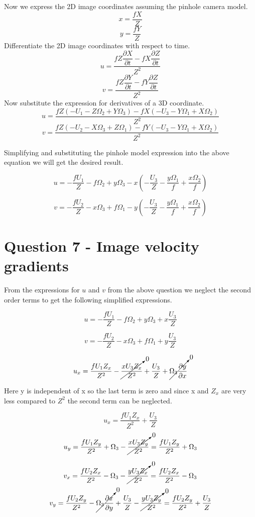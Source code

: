 \documentclass[12pt]{article}
\begin{document}
Now we express the 2D image coordinates assuming the pinhole camera model.
$$ x  = \dfrac {fX} {Z}$$
$$ y  = \dfrac {fY} {Z}$$
Differentiate the 2D image coordinates with respect to time.
$$ u  = \dfrac {fZ\dfrac {\partial X} {\partial t} - fX\dfrac {\partial Z} {\partial t}} {Z^2}$$
$$ v  = \dfrac {fZ\dfrac {\partial Y} {\partial t} - fY\dfrac {\partial Z} {\partial t}} {Z^2}$$
Now substitute the expression for derivatives of a 3D coordinate.
$$ u  = \dfrac {fZ\left( -U_1 -Z\Omega_2 + Y\Omega_3\right) - fX\left( -U_3 -Y\Omega_1 + X\Omega_2\right)} {Z^2}$$
$$ v  = \dfrac {fZ\left( -U_2 -X\Omega_3 + Z\Omega_1\right) - fY\left( -U_3 -Y\Omega_1 + X\Omega_2 \right)} {Z^2}$$

Simplifying and substituting the pinhole model expression into the above equation we will get the desired result.

$$u = -\dfrac{fU_1}{Z} - f\Omega_2 + y\Omega_3 - x\left( -\dfrac{U_3}{Z} - \dfrac{y\Omega_1}{f} + \dfrac{x\Omega_2}{f} \right)$$

$$v = -\dfrac{fU_2}{Z} - x\Omega_3 + f\Omega_1  - y\left( -\dfrac{U_3}{Z} - \dfrac{y\Omega_1}{f} + \dfrac{x\Omega_2}{f} \right)$$

\section{Question 7 - Image velocity gradients}
From the expressions for $u$ and $v$ from the above question we neglect the second order terms to get the following simplified expressions.

$$u = -\dfrac{fU_1}{Z} - f\Omega_2 + y\Omega_3 + x\dfrac{U_3}{Z}$$

$$v = -\dfrac{fU_2}{Z} - x\Omega_3 + f\Omega_1  +y\dfrac{U_3}{Z} $$

$$u_x = \dfrac{fU_1Z_x}{Z^2} - \cancelto{0}{\dfrac{xU_3Z_x}{Z^2}} + \dfrac{U_3}{Z} + \cancelto{0}{\Omega_3\dfrac{\partial y}{\partial x}}$$

Here y is independent of x so the last term is zero and since x and $Z_x$ are very less compared to $Z^2$ the second term can be neglected.

$$ u_x = \dfrac{fU_1Z_x}{Z^2}+ \dfrac{U_3}{Z}  $$
$$u_y = \dfrac{fU_1Z_y}{Z^2} + \Omega_3  - \cancelto{0}{\dfrac{xU_3Z_y}{Z^2}} = \dfrac{fU_1Z_y}{Z^2} + \Omega_3 $$

$$v_x = \dfrac{fU_2Z_x}{Z^2} - \Omega_3 -\cancelto{0}{\dfrac{yU_3Z_x}{Z^2}} = \dfrac{fU_2Z_x}{Z^2} - \Omega_3$$
$$v_y = \dfrac{fU_2Z_y}{Z^2} -  \cancelto{0}{\Omega_3\dfrac{\partial x}{\partial y}}+ \dfrac{U_3}{Z}- \cancelto{0}{\dfrac{yU_3Z_y}{Z^2}} =\dfrac{fU_2Z_y}{Z^2}  + \dfrac{U_3}{Z}  $$
\end{document}
